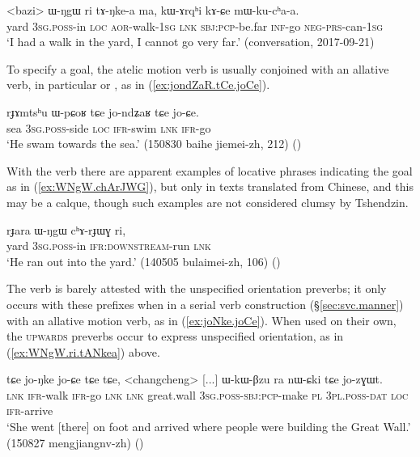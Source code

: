 \begin{exe}
\ex \label{ex:WNgW.ri.tANkea}
\gll <bazi> ɯ-ŋgɯ ri tɤ-ŋke-a ma, kɯ-ɤrqʰi kɤ-ɕe mɯ-ku-cʰa-a. \\
yard \textsc{3sg}.\textsc{poss}-in \textsc{loc} \textsc{aor}-walk-\textsc{1sg} \textsc{lnk} \textsc{sbj}:\textsc{pcp}-be.far \textsc{inf}-go \textsc{neg}-\textsc{prs}-can-\textsc{1sg} \\
\glt `I had a walk in the yard, I cannot go very far.' (conversation, 2017-09-21)
\end{exe}

To specify a goal, the atelic motion verb is usually conjoined with an allative verb, in particular  or , as in (\ref{ex:jondZaR.tCe.joCe}).

\begin{exe}
\ex \label{ex:jondZaR.tCe.joCe}
\gll rɟɤmtsʰu ɯ-pɕoʁ tɕe jo-ndʑaʁ tɕe jo-ɕe. \\
sea \textsc{3sg}.\textsc{poss}-side \textsc{loc} \textsc{ifr}-swim \textsc{lnk} \textsc{ifr}-go \\
\glt `He swam towards the sea.' (150830 baihe jiemei-zh, 212)
()
\end{exe}

With the verb  there are apparent examples of locative phrases indicating the goal as in (\ref{ex:WNgW.chArJWG}), but only in texts translated from Chinese, and this may be a calque, though such examples are not considered clumsy by Tshendzin.

\begin{exe}
\ex \label{ex:WNgW.chArJWG}
\gll  rɟara ɯ-ŋgɯ cʰɤ-rɟɯɣ ri, \\
yard \textsc{3sg}.\textsc{poss}-in \textsc{ifr}:\textsc{downstream}-run \textsc{lnk} \\
\glt `He ran out into the yard.' (140505 bulaimei-zh, 106) ()
\end{exe} 

The verb  is barely attested with the unspecified orientation preverbs; it only occurs with these prefixes when in a serial verb construction (§\ref{sec:svc.manner}) with an allative motion verb, as in (\ref{ex:joNke.joCe}). When used on their own, the \textsc{upwards} preverbs occur to express unspecified orientation, as in (\ref{ex:WNgW.ri.tANkea}) above.

\begin{exe}
\ex \label{ex:joNke.joCe}
\gll tɕe jo-ŋke jo-ɕe tɕe tɕe, <changcheng> [...] ɯ-kɯ-βzu ra nɯ-ɕki tɕe jo-zɣɯt. \\
\textsc{lnk} \textsc{ifr}-walk \textsc{ifr}-go \textsc{lnk} \textsc{lnk} great.wall {  } \textsc{3sg}.\textsc{poss}-\textsc{sbj}:\textsc{pcp}-make \textsc{pl} \textsc{3pl}.\textsc{poss}-\textsc{dat} \textsc{loc} \textsc{ifr}-arrive \\
\glt `She went [there] on foot and arrived where people were building the Great Wall.' (150827 mengjiangnv-zh) ()
\end{exe}

